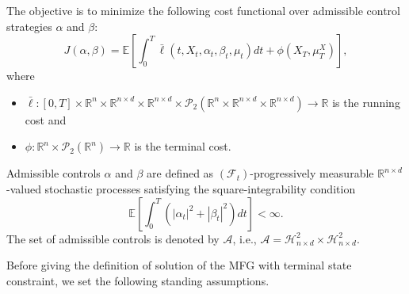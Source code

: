 \documentclass[11pt,a4paper]{article}
\begin{document}
The objective is to minimize the following cost functional over admissible control strategies $\alpha$ and $\beta$:
\begin{equation} 
\label{Cost functional CN}
   J(\alpha, \beta)=\mathbb{E}\left[\int _0^T \bar{\ell}(t,X_t,  \alpha_t, \beta_t, \mu_t)dt+\phi(X_T,\mu_T^X) \right],
\end{equation}
where 
\begin{itemize}
    \item $\bar{\ell}:[0, T ] \times\mathbb{R}^n\times  \mathbb{R}^{n\times d}\times \mathbb{R}^{n\times d} \times  \mathcal P_2(\mathbb R^n \times \mathbb R^{n\times d} \times \mathbb R^{n\times d}) \to \mathbb{R}$ is the running cost and
    \item $\phi :\mathbb{R}^n\times\mathcal{P}_2(\mathbb{R}^n) \to \mathbb{R}$ is the terminal cost.
\end{itemize}
Admissible controls $\alpha$ and $\beta$ are defined as $(\mathcal F_t)$-progressively measurable $\mathbb R^{n \times d}$-valued stochastic processes satisfying the square-integrability condition
\[\mathbb{E} \left[\int_0^T \left( |\alpha_t|^2 + |\beta_t|^2 \right) dt \right] < \infty.
    \label{admissibility condition}\]  
The set of admissible controls is denoted by $\mathcal{A}$, i.e., $\mathcal A = \mathcal H^2 _{n\times d} \times \mathcal H^2 _{n\times d}$.

Before giving the definition of solution of the MFG with terminal state constraint, we set the following standing assumptions.
\end{document}
